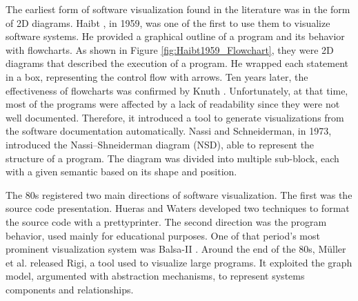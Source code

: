 The earliest form of software visualization found in the literature was in the form of 2D diagrams. 
Haibt \cite{Haibt1959}, in 1959, was one of the first to use them to visualize software systems. 
He provided a graphical outline of a program and its behavior with flowcharts. As shown in Figure \ref{fig:Haibt1959_Flowchart}, they 
were 2D diagrams that described the execution of a program. He wrapped each statement in a box, representing the control flow with arrows.
Ten years later, the effectiveness of flowcharts was confirmed by Knuth \cite{Knuth1963}. 
Unfortunately, at that time, most of the programs were affected by a lack of readability since they were not well documented. 
Therefore, it introduced a tool to generate visualizations from the software documentation automatically. 
Nassi and Schneiderman\cite{Nassi1973}, in 1973, introduced the Nassi–Shneiderman diagram (NSD), able to represent the structure of a program. 
The diagram was divided into multiple sub-block, each with a given semantic based on its shape and position. 


The 80s registered two main directions of software visualization. The first was the source code presentation.
Hueras \cite{Hueras1977} and Waters \cite{Waters1983} developed two techniques to format the source code with a prettyprinter. 
The second direction was the program behavior, used mainly for educational purposes. One of that period's most prominent visualization system was Balsa-II \cite{Brown1988}.
Around the end of the 80s, Müller et al. \cite{Mueller1988} released Rigi, a tool used to visualize large programs.
It exploited the graph model, argumented with abstraction mechanisms, to represent systems components and relationships. 






